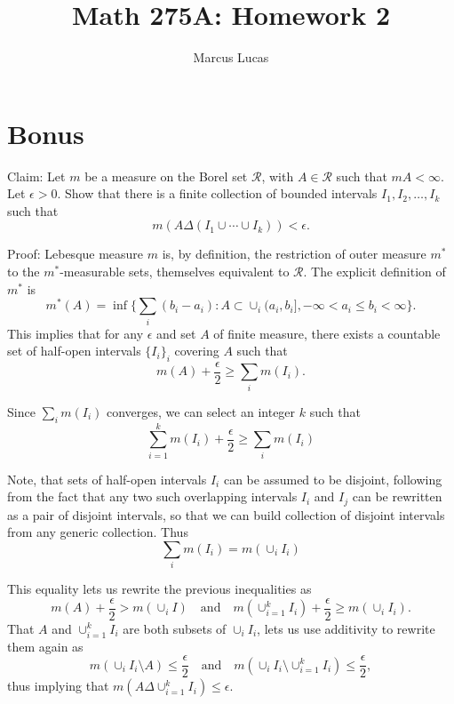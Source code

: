 \documentclass[10pt]{article}
\title{Math 275A: Homework 2}
\author{Marcus Lucas}
\date{\vspace{-1cm}}
\begin{document}
\maketitle


\section{Bonus}

Claim: Let $m$ be a measure on the Borel set $\mathcal{R}$, 
with $A \in \mathcal{R}$ such that $m A < \infty$.
Let $\epsilon > 0$. Show that there is a finite collection of
bounded intervals $I_1,I_2, \dots, I_k$ such that
\begin{equation*}
  m(A \Delta  (I_1 \cup \cdots \cup I_k)) < \epsilon.
\end{equation*}

Proof: Lebesque measure $m$ is, by definition, 
the restriction of outer measure $m^*$
to the $m^*$-measurable sets, 
themselves equivalent to $\mathcal{R}$.
The explicit definition of $m^*$ is
\begin{equation*}
  m^*(A) = \inf \{\sum_i (b_i - a_i): 
    A \subset \cup_i (a_i, b_i], 
    -\infty < a_i \le b_i < \infty \}.
\end{equation*}
This implies that for any $\epsilon$ and set $A$ of finite measure,
there exists a countable set of half-open intervals $\{I_i\}_i$ 
covering $A$ such that
\begin{equation*}
  m(A) + \frac{\epsilon}{2} \ge \sum_i m(I_i).
\end{equation*}

Since $\sum_i m(I_i)$ converges, we can select an integer $k$
such that
\begin{equation*}
  \sum_{i=1}^k m(I_i) + \frac{\epsilon}{2} \ge \sum_i m(I_i)
\end{equation*}

Note, that sets of half-open intervals $I_i$ 
can be assumed to be disjoint, following from the fact that
any two such overlapping intervals $I_i$ and $I_j$ can be rewritten 
as a pair of disjoint intervals, so that we can build
collection of disjoint intervals from any generic collection.
Thus
\begin{equation*}
  \sum_i m(I_i) = m(\cup_i I_i)
\end{equation*}

This equality lets us rewrite the previous inequalities as
\begin{equation*}
  m(A) + \frac{\epsilon}{2} > m (\cup_i I) \quad \text{and} \quad
  m(\cup_{i=1}^k I_i) + \frac{\epsilon}{2} \ge m(\cup_i I_i).
\end{equation*}
That $A$ and $\cup_{i=1}^k I_i$ are both subsets of $\cup_i I_i$,
lets us use additivity to rewrite them again as
\begin{equation*}
  m(\cup_i I_i \setminus A) \le \frac{\epsilon}{2} 
  \quad \text{and} \quad
  m(\cup_i I_i \setminus \cup_{i=1}^k I_i) \le \frac{\epsilon}{2},
\end{equation*}
thus implying that $m(A \Delta \cup_{i=1}^k I_i) \le \epsilon$.
\end{document}
